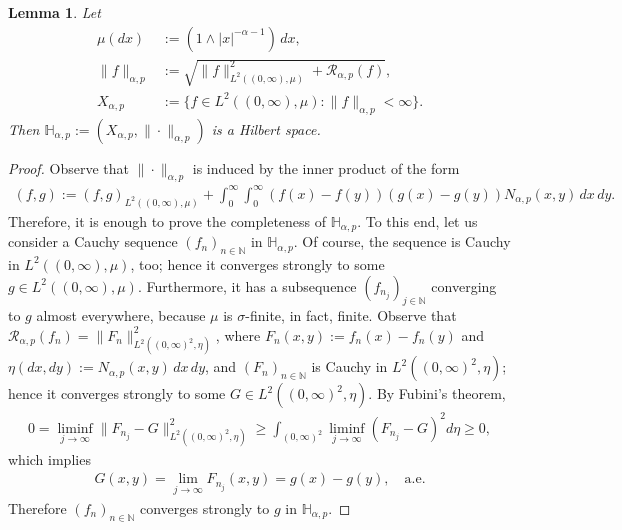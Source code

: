 \documentclass[12pt, a4paper]{amsart}
\newtheorem{lemma}[theorem]{Lemma}
\newcommand{\RR}{\mathcal{R}}
\begin{document}
\begin{lemma}
\label{lemma: Hilbert}
Let
          \begin{align*}
            \mu(dx) &:= (1\wedge |x|^{-\alpha -1})\,dx,
            \\
            \|f\|_{\alpha, p} &:= \sqrt{\|f\|_{L^2((0,\infty),\mu)}^2 + \RR_{\alpha, p}(f) },
            \\
            X_{\alpha, p} &:= \{ f \in L^2((0,\infty),\mu) : \|f\|_{\alpha, p} <\infty\}.
          \end{align*}
          Then $\mathbb{H}_{\alpha, p} := (X_{\alpha, p}, \|\cdot\|_{\alpha, p})$ is a Hilbert space.
\end{lemma}

\begin{proof} Observe that $\|\cdot\|_{\alpha, p}$ is induced by the inner product of the form
\begin{align*}
    (f, g) := (f, g)_{L^2((0, \infty), \mu)} + \int_{0}^{\infty} \int_{0}^{\infty}\left(f(x)-f(y)\right)\left(g(x)-g(y)\right)N_{\alpha, p}(x, y)\,dx\,dy.
\end{align*}
Therefore, it is enough to prove the completeness of $\mathbb{H}_{\alpha, p}$. To this end, let us consider a Cauchy sequence $(f_n)_{n \in \mathbb{N}}$ in $\mathbb{H}_{\alpha, p}$. Of course, the sequence is Cauchy in $L^2((0,\infty),\mu)$, too; hence it converges strongly to some $g \in L^2((0,\infty),\mu)$. Furthermore, it has a subsequence $(f_{n_j})_{j \in \mathbb{N}}$ converging to $g$ almost everywhere, because $\mu$ is $\sigma$-finite, in fact, finite. Observe that $\RR_{\alpha, p}(f_n) = \|F_n\|^2_{L^2((0, \infty)^2, \eta)}$, where $F_n(x, y) := f_n(x)-f_n(y)$ and $\eta(dx, dy) := N_{\alpha, p}(x, y) \,dx\,dy$, and $(F_n)_{n \in \mathbb{N}}$ is Cauchy in $L^2((0, \infty)^2, \eta)$; hence it converges strongly to some $G \in L^2((0, \infty)^2, \eta)$. By Fubini's theorem,
\begin{align*}
    0 = \liminf_{j \rightarrow \infty}\| F_{n_j}  - G\|_{L^2((0,\infty)^2, \eta)}^2 \geq \int_{(0,\infty)^2}\liminf_{j \rightarrow \infty}(F_{n_j} - G)^2d\eta \geq 0,
\end{align*}
which implies
\begin{align*}
    G(x, y) = \lim_{j \rightarrow \infty}F_{n_j}(x, y) = g(x) - g(y), \quad \text{a.e.}
\end{align*}
Therefore $(f_n)_{n \in \mathbb{N}}$ converges strongly to $g$ in $\mathbb{H}_{\alpha, p}$.
\end{proof}
\end{document}
